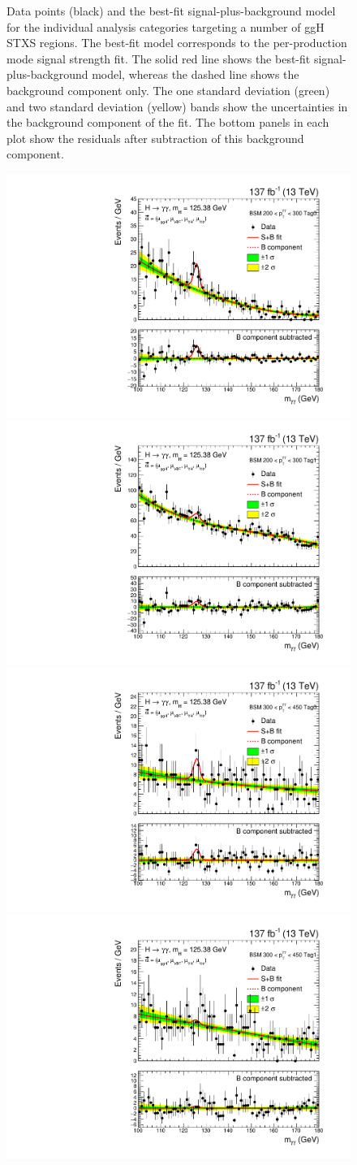 \begin{figure}[htbp]
  \caption[Observed diphoton mass distributions: ggH 1J and ggH $\geq$2J]
  {
    Data points (black) and the best-fit signal-plus-background model for the individual analysis categories targeting a number of ggH STXS regions. The best-fit model corresponds to the per-production mode signal strength fit. The solid red line shows the best-fit signal-plus-background model, whereas the dashed line shows the background component only. The one standard deviation (green) and two standard deviation (yellow) bands show the uncertainties in the background component of the fit. The bottom panels in each plot show the residuals after subtraction of this background component.
  }
  \label{fig:diphoton_mass_1}
\end{figure}


\begin{figure}[htbp]
  \centering
  \includegraphics[width=.32\linewidth]{Figures/app_sb_models/RECO_PTH_200_300_Tag0_CMS_hgg_mass.pdf}
  \includegraphics[width=.32\linewidth]{Figures/app_sb_models/RECO_PTH_200_300_Tag1_CMS_hgg_mass.pdf}
  \includegraphics[width=.32\linewidth]{Figures/app_sb_models/RECO_PTH_300_450_Tag0_CMS_hgg_mass.pdf}
  \includegraphics[width=.32\linewidth]{Figures/app_sb_models/RECO_PTH_300_450_Tag1_CMS_hgg_mass.pdf}

\end{figure}
